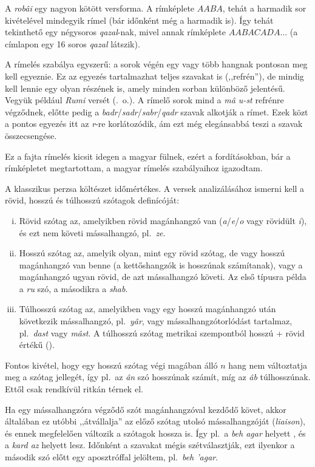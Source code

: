 A \emph{robâi} egy nagyon kötött versforma. A rímképlete $AABA$, tehát
a harmadik sor kivételével mindegyik rímel (bár időnként még a
harmadik is). Így tehát tekinthető egy négysoros \emph{qazal}-nak,
mivel annak rímképlete $AABACADA\dots$ (a címlapon egy 16 soros
\emph{qazal} látszik).

A rímelés szabálya egyszerű: a sorok végén egy vagy több hangnak
pontosan meg kell egyeznie. Ez az egyezés tartalmazhat teljes szavakat
is (,,refrén''), de mindig kell lennie egy olyan részének is, amely
minden sorban különböző jelentésű. Vegyük például \emph{Rumi} versét
(\pageref{Rumi}.~o.). A rímelő sorok mind a \emph{mâ u-st} refrénre
végződnek, előtte pedig a
\emph{badr}/\emph{sadr}/\emph{sabr}/\emph{qadr} szavak alkotják a
rímet. Ezek közt a pontos egyezés itt az \emph{r}-re korlátozódik, ám
ezt még elegánsabbá teszi a szavak összecsengése.

Ez a fajta rímelés kicsit idegen a magyar fülnek, ezért a
fordításokban, bár a rímképletet megtartottam, a magyar rímelés
szabályaihoz igazodtam.

A klasszikus perzsa költészet időmértékes. A versek analizálásához
ismerni kell a rövid, hosszú és túlhosszú szótagok definícóját:

\begin{enumerate}[i)]
  \item Rövid szótag az, amelyikben rövid magánhangzó van
    (\emph{a}/\emph{e}/\emph{o} vagy rövidült \emph{i}), és ezt nem
    követi mássalhangzó, pl.~\emph{ze}.
  \item Hosszú szótag az, amelyik olyan, mint egy rövid szótag, de
    vagy hosszú magánhangzó van benne (a kettőshangzók is hosszúnak
    számítanak), vagy a magánhangzó ugyan rövid, de azt mássalhangzó
    követi. Az első típusra példa a \emph{ru} szó, a másodikra a
    \emph{shab}.
  \item Túlhosszú szótag az, amelyikben vagy egy hosszú magánhangzó
    után következik mássalhangzó, pl.~\emph{yâr}, vagy
    mássalhangzótorlódást tartalmaz, pl.~\emph{dast} vagy
    \emph{mâst}. A túlhosszú szótag metrikai szempontból hosszú +
    rövid értékű (\metra{\m\b}).
\end{enumerate}

Fontos kivétel, hogy egy hosszú szótag végi magában álló $n$ hang nem
változtatja meg a szótag jellegét, így pl.~az \emph{ân} szó hosszúnak
számít, míg az \emph{âb} túlhosszúnak. Ettől csak rendkívül ritkán
térnek el.

Ha egy mássalhangzóra végződő szót magánhangzóval kezdődő követ, akkor
általában ez utóbbi ,,átvállalja'' az előző szótag utolsó
mássalhangzóját (\emph{liaison}), és ennek megfelelően változik a
szótagok hossza is. Így pl.~a \emph{beh agar} \metra{\m\b\m} helyett
\metra{\b\b\m}, és a \emph{kard az} \metra{\m\b\m} helyett
\metra{\m\m} lesz. Időnként a szavakat mégis szétválasztják, ezt
ilyenkor a második szó előtt egy aposztróffal jelöltem, pl.~\emph{beh
'agar}.

